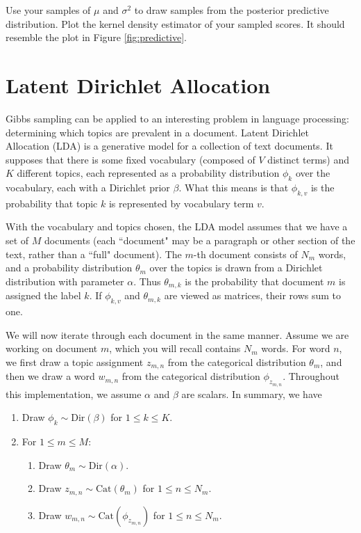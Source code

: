 \begin{problem}
Use your samples of $\mu$ and $\sigma^{2}$ to draw samples from the posterior predictive distribution. Plot the kernel density estimator of your sampled scores.
It should resemble the plot in Figure \ref{fig:predictive}.
\end{problem}

\section*{Latent Dirichlet Allocation}
Gibbs sampling can be applied to an interesting problem in language processing: determining which topics are prevalent in a document.
Latent Dirichlet Allocation (LDA) is a generative model for a collection of text documents.
It supposes that there is some fixed vocabulary (composed of $V$ distinct terms) and $K$ different topics, each represented as a probability distribution $\phi_{k}$ over the vocabulary, each with a Dirichlet prior $\beta$.
What this means is that $\phi_{k,v}$ is the probability that topic $k$ is represented by vocabulary term $v$.

With the vocabulary and topics chosen, the LDA model assumes that we have a set of $M$ documents (each ``document" may be a paragraph or other section of the text, rather than a ``full" document).
The $m$-th document consists of $N_m$ words, and
a probability distribution $\theta_{m}$ over the topics is drawn from a Dirichlet distribution with parameter $\alpha$.
Thus $\theta_{m,k}$ is the probability that document $m$ is assigned the label $k$.
If $\phi_{k,v}$ and $\theta_{m,k}$ are viewed as matrices, their rows sum to one.

We will now iterate through each document in the same manner.  Assume we are working on document $m$, which you will recall contains $N_{m}$ words.  For word $n$, we first draw a topic assignment $z_{m,n}$ from the categorical distribution $\theta_{m}$, and then we draw a word $w_{m,n}$ from the categorical distribution $\phi_{z_{m,n}}$. Throughout this implementation, we assume $\alpha$ and $\beta$ are scalars. In summary, we have
\begin{enumerate}
	\item Draw $\phi_{k} \sim \text{Dir}(\beta)$ for $1 \leq k \leq K$.
	\item For $1 \leq m \leq M$:
	\begin{enumerate}
        \item Draw $\theta_{m} \sim \text{Dir}(\alpha)$.
        \item Draw $z_{m,n} \sim \text{Cat}(\theta_{m})$ for $1 \leq n \leq N_{m}$.
	    \item Draw $w_{m,n} \sim \text{Cat}(\phi_{z_{m,n}})$ for $1 \leq n \leq N_{m}$.
	\end{enumerate}
\end{enumerate}


